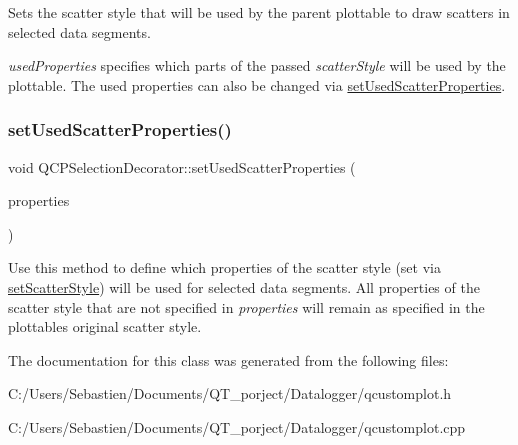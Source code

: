 Sets the scatter style that will be used by the parent plottable to draw scatters in selected data segments.

{\itshape used\+Properties} specifies which parts of the passed {\itshape scatter\+Style} will be used by the plottable. The used properties can also be changed via \hyperlink{class_q_c_p_selection_decorator_a808c1607cd4e83869c04986e332455c0}{set\+Used\+Scatter\+Properties}. \mbox{\label{class_q_c_p_selection_decorator_a808c1607cd4e83869c04986e332455c0}} 
\subsubsection{\texorpdfstring{set\+Used\+Scatter\+Properties()}{setUsedScatterProperties()}}
{\footnotesize\ttfamily void Q\+C\+P\+Selection\+Decorator\+::set\+Used\+Scatter\+Properties (\begin{DoxyParamCaption}\item[{const Q\+C\+P\+Scatter\+Style\+::\+Scatter\+Properties \&}]{properties }\end{DoxyParamCaption})}

Use this method to define which properties of the scatter style (set via \hyperlink{class_q_c_p_selection_decorator_ab403a613289714ff4fd4a0c0371ab116}{set\+Scatter\+Style}) will be used for selected data segments. All properties of the scatter style that are not specified in {\itshape properties} will remain as specified in the plottable\textquotesingle{}s original scatter style. 

The documentation for this class was generated from the following files\+:\begin{DoxyCompactItemize}
\item 
C\+:/\+Users/\+Sebastien/\+Documents/\+Q\+T\+\_\+porject/\+Datalogger/qcustomplot.\+h\item 
C\+:/\+Users/\+Sebastien/\+Documents/\+Q\+T\+\_\+porject/\+Datalogger/qcustomplot.\+cpp\end{DoxyCompactItemize}
